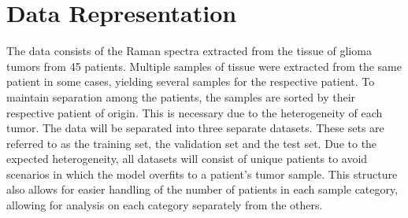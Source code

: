 \section{Data Representation}
The data consists of the Raman spectra extracted from the tissue of glioma tumors from 45 patients. Multiple samples of tissue were extracted from the same patient in some cases, yielding several samples for the respective patient. To maintain separation among the patients, the samples are sorted by their respective patient of origin. This is necessary due to the heterogeneity of each tumor. The data will be separated into three separate datasets. These sets are referred to as the training set, the validation set and the test set. Due to the expected heterogeneity, all datasets will consist of unique patients to avoid scenarios in which the model overfits to a patient's tumor sample. This structure also allows for easier handling of the number of patients in each sample category, allowing for analysis on each category separately from the others.

